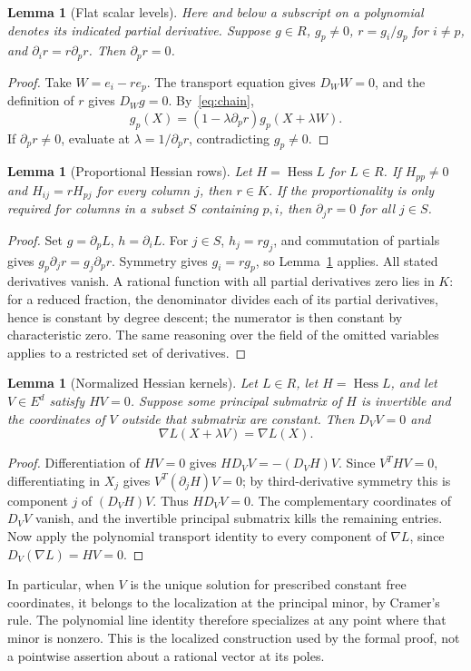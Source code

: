 \documentclass[11pt,a4paper]{article}
\newtheorem{lemma}[theorem]{Lemma}
\newcommand{\Hess}{\operatorname{Hess}}
\begin{document}
\begin{lemma}[Flat scalar levels]\label{lem:flat}
Here and below a subscript on a polynomial denotes its indicated partial derivative. Suppose $g\in R$, $g_p\ne0$, $r=g_i/g_p$ for $i\ne p$, and $\partial_i r=r\partial_p r$. Then $\partial_p r=0$.
\end{lemma}
\begin{proof}
Take $W=e_i-r e_p$. The transport equation gives $D_WW=0$, and the definition of $r$ gives $D_Wg=0$. By~\eqref{eq:chain},
\[
 g_p(X)=(1-\lambda\partial_p r)g_p(X+\lambda W).
\]
If $\partial_p r\ne0$, evaluate at $\lambda=1/\partial_p r$, contradicting $g_p\ne0$.
\end{proof}

\begin{lemma}[Proportional Hessian rows]\label{lem:rows}
Let $H=\Hess L$ for $L\in R$. If $H_{pp}\ne0$ and $H_{ij}=rH_{pj}$ for every column $j$, then $r\in K$. If the proportionality is only required for columns in a subset $S$ containing $p,i$, then $\partial_jr=0$ for all $j\in S$.
\end{lemma}
\begin{proof}
Set $g=\partial_p L$, $h=\partial_i L$. For $j\in S$, $h_j=rg_j$, and commutation of partials gives $g_p\partial_jr=g_j\partial_pr$. Symmetry gives $g_i=rg_p$, so Lemma~\ref{lem:flat} applies. All stated derivatives vanish. A rational function with all partial derivatives zero lies in $K$: for a reduced fraction, the denominator divides each of its partial derivatives, hence is constant by degree descent; the numerator is then constant by characteristic zero. The same reasoning over the field of the omitted variables applies to a restricted set of derivatives.
\end{proof}

\begin{lemma}[Normalized Hessian kernels]\label{lem:kerneltransport}
Let $L\in R$, let $H=\Hess L$, and let $V\in E^d$ satisfy $HV=0$. Suppose some principal submatrix of $H$ is invertible and the coordinates of $V$ outside that submatrix are constant. Then $D_VV=0$ and
\[
 \nabla L(X+\lambda V)=\nabla L(X).
\]
\end{lemma}
\begin{proof}
Differentiation of $HV=0$ gives $H D_VV=-(D_VH)V$. Since $V^THV=0$, differentiating in $X_j$ gives $V^T(\partial_jH)V=0$; by third-derivative symmetry this is component $j$ of $(D_VH)V$. Thus $H D_VV=0$. The complementary coordinates of $D_VV$ vanish, and the invertible principal submatrix kills the remaining entries. Now apply the polynomial transport identity to every component of $\nabla L$, since $D_V(\nabla L)=HV=0$.
\end{proof}
In particular, when $V$ is the unique solution for prescribed constant free coordinates, it belongs to the localization at the principal minor, by Cramer's rule. The polynomial line identity therefore specializes at any point where that minor is nonzero. This is the localized construction used by the formal proof, not a pointwise assertion about a rational vector at its poles.
\end{document}
